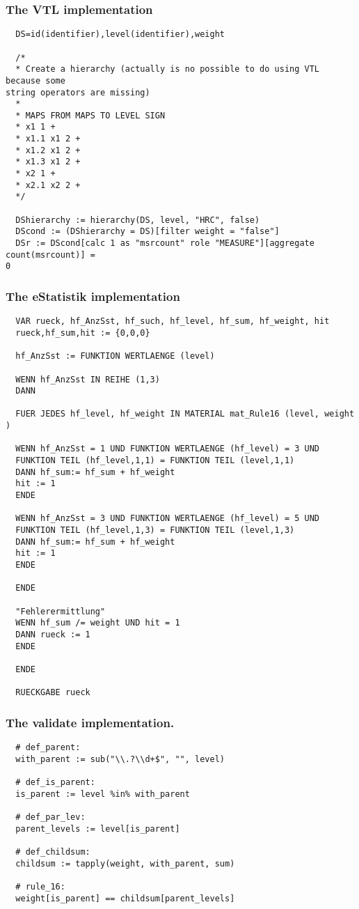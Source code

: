 \subsubsection*{The VTL implementation}
\begin{verbatim}
  DS=id(identifier),level(identifier),weight

  /*
  * Create a hierarchy (actually is no possible to do using VTL because some
string operators are missing)
  *
  * MAPS FROM MAPS TO LEVEL SIGN
  * x1 1 +
  * x1.1 x1 2 +
  * x1.2 x1 2 +
  * x1.3 x1 2 +
  * x2 1 +
  * x2.1 x2 2 +
  */

  DShierarchy := hierarchy(DS, level, "HRC", false)
  DScond := (DShierarchy = DS)[filter weight = "false"]
  DSr := DScond[calc 1 as "msrcount" role "MEASURE"][aggregate count(msrcount)] =
0
\end{verbatim}
\subsubsection*{The eStatistik implementation}
\begin{verbatim}
  VAR rueck, hf_AnzSst, hf_such, hf_level, hf_sum, hf_weight, hit
  rueck,hf_sum,hit := {0,0,0}

  hf_AnzSst := FUNKTION WERTLAENGE (level)

  WENN hf_AnzSst IN REIHE (1,3)
  DANN

  FUER JEDES hf_level, hf_weight IN MATERIAL mat_Rule16 (level, weight )

  WENN hf_AnzSst = 1 UND FUNKTION WERTLAENGE (hf_level) = 3 UND
  FUNKTION TEIL (hf_level,1,1) = FUNKTION TEIL (level,1,1)
  DANN hf_sum:= hf_sum + hf_weight
  hit := 1
  ENDE

  WENN hf_AnzSst = 3 UND FUNKTION WERTLAENGE (hf_level) = 5 UND
  FUNKTION TEIL (hf_level,1,3) = FUNKTION TEIL (level,1,3)
  DANN hf_sum:= hf_sum + hf_weight
  hit := 1
  ENDE

  ENDE

  "Fehlerermittlung"
  WENN hf_sum /= weight UND hit = 1
  DANN rueck := 1
  ENDE

  ENDE

  RUECKGABE rueck
\end{verbatim}
\subsubsection*{The validate implementation.}
\begin{verbatim}
  # def_parent:
  with_parent := sub("\\.?\\d+$", "", level)

  # def_is_parent:
  is_parent := level %in% with_parent

  # def_par_lev:
  parent_levels := level[is_parent]

  # def_childsum:
  childsum := tapply(weight, with_parent, sum)

  # rule_16:
  weight[is_parent] == childsum[parent_levels]
\end{verbatim}



